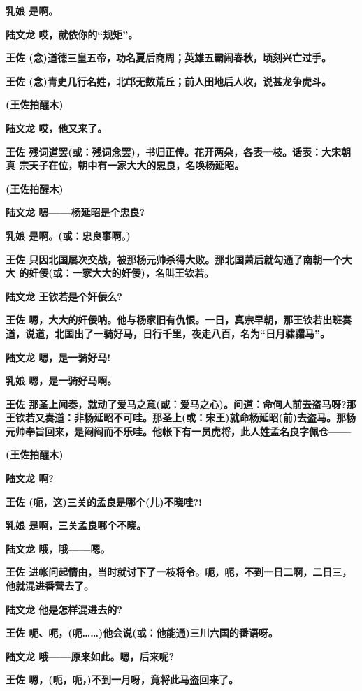 \textbf{乳娘 是啊。}

\textbf{陆文龙 哎，就依你的``规矩''。}

\textbf{王佐
(念)道德三皇五帝，功名夏后商周；英雄五霸闹春秋，顷刻兴亡过手。}

\textbf{王佐
(念)青史几行名姓，北邙无数荒丘；前人田地后人收，说甚龙争虎斗。}

\textbf{(王佐拍醒木)}

\textbf{陆文龙 哎，他又来了。}

\textbf{王佐
残词道罢(或：残词念罢)，书归正传。花开两朵，各表一枝。话表：大宋朝真
宗天子在位，朝中有一家大大的忠良，名唤杨延昭。}

\textbf{(王佐拍醒木)}

\textbf{陆文龙 嗯------杨延昭是个忠良?}

\textbf{乳娘 是啊。(或：忠良事啊。)}

\textbf{王佐
只因北国屡次交战，被那杨元帅杀得大败。那北国萧后就勾通了南朝一个大大
的奸佞(或：一家大大的奸佞)，名叫王钦若。}

\textbf{陆文龙 王钦若是个奸佞么?}

\textbf{王佐
嗯，大大的奸佞呐。他与杨家旧有仇恨。一日，真宗早朝，那王钦若出班奏道，说道，北国出了一骑好马，日行千里，夜走八百，名为``日月骕骦马''。}

\textbf{陆文龙 嗯，是一骑好马!}

\textbf{乳娘 嗯，是一骑好马啊。}

\textbf{王佐
那圣上闻奏，就动了爱马之意(或：爱马之心)。问道：命何人前去盗马呀?那王钦若又奏道：非杨延昭不可哇。那圣上(或：宋王)就命杨延昭(前)去盗马。那杨元帅奉旨回来，是闷闷而不乐哇。他帐下有一员虎将，此人姓孟名良字佩仓------}

\textbf{(王佐拍醒木)}

\textbf{陆文龙 啊?}

\textbf{王佐 (呃，这)三关的孟良是哪个(儿)不晓哇?!}

\textbf{乳娘 是啊，三关孟良哪个不晓。}

\textbf{陆文龙 哦，哦------嗯。}

\textbf{王佐
进帐问起情由，当时就讨下了一枝将令。呃，呃，不到一日二啊，二日三，他就混进番营去了。}

\textbf{陆文龙 他是怎样混进去的?}

\textbf{王佐
呃、呃，(呃\ldots{}\ldots{})他会说(或：他能通)三川六国的番语呀。}

\textbf{陆文龙 哦------原来如此。嗯，后来呢?}

\textbf{王佐 嗯，(呃，呃，)不到一月呀，竟将此马盗回来了。}

